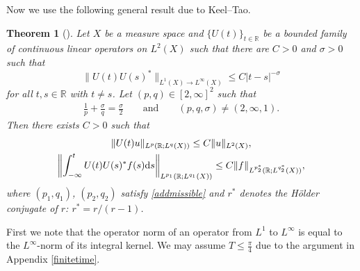 \documentclass[10pt,a4paper]{amsart}
\numberwithin{equation}{section}
\newtheorem{Theorem}{Theorem}[section]
\def\R{\mathbb{R}}%
\def\s{\sigma}
\begin{document}
Now we use the following general result due to Keel--Tao.




\begin{Theorem}[\cite{KT}]\label{KeelTao}
Let $X$ be a measure space and $\{U(t)\}_{t\in \R}$ be a bounded family of continuous linear operators on $L^2(X)$ such that there are $C>0$ and $\s>0$ such that
\[
\|U(t)U(s)^*\|_{L^1(X)\to L^{\infty}(X)}\leq C|t-s|^{-\s}
\]
 for all $t,s\in \R$ with $t\neq s$. Let $(p,q)\in [2,\infty]^2$ such that
\begin{align}\label{addmissible}
\frac{1}{p}+\frac{\s}{q}=\frac{\s}{2} \qquad \text{and}\qquad (p,q,\s)\neq (2,\infty,1).
\end{align}
Then there exists $C>0$ such that
\begin{gather*}
\|U(t)u\|_{L^p(\R; L^q(X))}\leq C\|u\|_{L^2(X)},\\
 \left\|\int_{-\infty}^tU(t)U(s)^*f(s){\rm d}s \right\|_{L^{p_1}(\R; L^{q_1}(X))} \leq C\|f\|_{L^{p_2^*}(\R; L^{q_2^*}(X))},
\end{gather*}
where $(p_1,q_1)$, $(p_2,q_2)$ satisfy \eqref{addmissible} and $r^*$ denotes the H\"older conjugate of $r$: $r^*=r/(r-1)$.



\end{Theorem}





First we note that the operator norm of an operator from $L^1$ to $L^{\infty}$ is equal to the $L^{\infty}$-norm of its integral kernel.
We may assume $T\leq \frac{\pi}{4}$ due to the argument in Appendix \ref{finitetime}.
\end{document}
